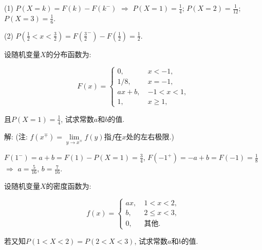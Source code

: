 \documentclass[standard]{ExBook}
\begin{document}
\begin{qitems}
\begin{bbox}
(1) $P(X=k)=F(k)-F(k^{-})$ $\Longrightarrow$ $P(X=1)=\frac{1}{4}$; $P(X=2)=\frac{1}{12}$; $P(X=3)=\frac{1}{6}$.

(2) $P(\frac{1}{2}<x<\frac{3}{2})=F(\frac{3}{2}^-)-F(\frac{1}{2})=\frac{1}{2}$.
    \end{bbox}

\vspace{-5em}

    \begin{bbox}
    \begin{shaded}
        \qitem
设随机变量$X$的分布函数为:
\vspace{-2em}
\begin{center}
\begin{equation}
    F(x)=
    \left\{
    \begin{array}{cl}
        \nonumber
        0,\ &x < -1,\\
        1/8,\ &x=-1,\\
        ax+b,\ &-1 < x < 1,\\
        1,\ &x \geq 1,
    \end{array}
    \right.
\end{equation}
\end{center}
且$P(X=1)=\displaystyle\frac{1}{4}$, 试求常数$a$和$b$的值.
    \end{shaded}
    \end{bbox}

\vspace{-5em}

    \begin{bbox}
解: (注: $f(x^\mp)=\lim\limits_{y\to x^\mp}f(y)$指$f$在$x$处的左右极限.)

$F(1^-)=a+b=F(1)-P(X=1)=\displaystyle\frac{3}{4}$, $F(-1^+)=-a+b=F(-1)=\displaystyle\frac{1}{8}$ $\Longrightarrow$ $a=\displaystyle\frac{5}{16}$, $b=\displaystyle\frac{7}{16}$.
    \end{bbox}

\vspace{-5em}

    \begin{bbox}
    \begin{shaded}
        \qitem
设随机变量$X$的密度函数为:
\vspace{-2em}
\begin{center}
\begin{equation}
    f(x)=
    \left\{
    \begin{array}{cl}
        \nonumber
        ax,\ &1 < x < 2,\\
        b,\ &2 \leq x < 3,\\
        0,\ &\text{其他}.
    \end{array}
    \right.
\end{equation}
\end{center}
若又知$P(1 < X <2)=P(2 < X < 3)$, 试求常数$a$和$b$的值.
    \end{shaded}
    \end{bbox}


\end{qitems}
\end{document}
